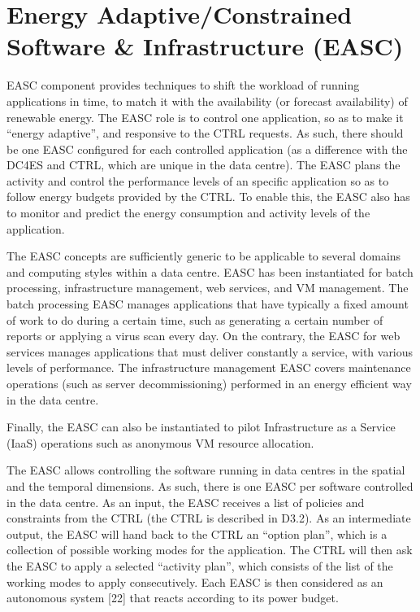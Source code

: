 \section{Energy Adaptive/Constrained Software & Infrastructure (EASC)}

EASC component provides techniques to shift the workload of running applications in time, to match it with the availability (or forecast availability) of renewable energy. The EASC role is to control one application, so as to make it “energy adaptive”, and responsive to the CTRL requests. As such, there should be one EASC configured for each controlled application (as a difference with the DC4ES and CTRL, which are unique in the data centre). The EASC plans the activity and control the performance levels of an specific application so as to follow energy budgets provided by the CTRL. To enable this, the EASC also has to monitor and predict the energy consumption and activity levels of the application.

The EASC concepts are sufficiently generic to be applicable to several domains and computing styles within a data centre. EASC has been instantiated for batch processing, infrastructure management, web services, and VM management. The batch processing EASC manages applications that have typically a fixed amount of work to do during a certain time, such as generating a certain number of reports or applying a virus scan every day. On the contrary, the EASC for web services manages applications that must deliver constantly a service, with various levels of performance. The infrastructure management EASC covers maintenance operations (such as server decommissioning) performed in an energy efficient way in the data centre.

Finally, the EASC can also be instantiated to pilot Infrastructure as a Service (IaaS) operations such as anonymous VM resource allocation.

The EASC allows controlling the software running in data centres in the spatial and the temporal dimensions. As such, there is one EASC per software controlled in the data centre. As an input, the EASC receives a list of policies and constraints from the CTRL (the CTRL is described in D3.2). As an intermediate output, the EASC will hand back to the CTRL an “option plan”, which is a collection of possible working modes for the application. The CTRL will then ask the EASC to apply a selected “activity plan”, which consists of the list of the working modes to apply consecutively. Each EASC is then considered as an autonomous system [22] that reacts according to its power budget.

